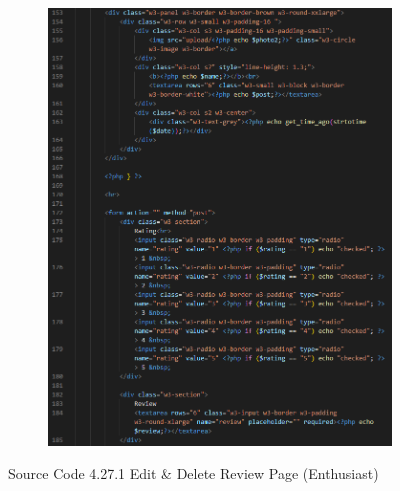 \begin{enumerate}[1.]
\begin{figure}[h]
\begin{subfigure}[b]{0.7\textwidth}
            \label{fig:sub1}
        \end{subfigure}
        \hspace{0.04\textwidth}
        \begin{subfigure}[b]{0.7\textwidth}
            \centering
            \includegraphics[width=\textwidth]{mainmatter/images/frontend/code/eeditereview2.png}
            \label{fig:sub2}
        \end{subfigure}
        \caption*{Source Code 4.27.1 Edit \& Delete Review Page (Enthusiast)}
        \label{fig:myfig66a}
    \end{figure}
    \clearpage
    \begin{figure}[h]\ContinuedFloat
        \centering
        \begin{subfigure}[b]{0.8\textwidth}
            \centering

\end{subfigure}
\end{figure}
\end{enumerate}

